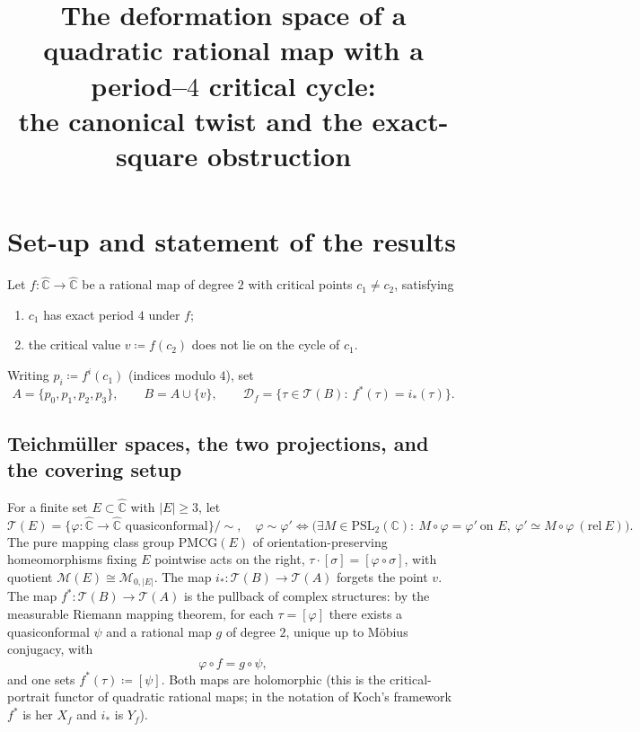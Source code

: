 \documentclass[11pt]{article}
\theoremstyle{definition}
\theoremstyle{remark}
\newcommand{\Teich}{\mathcal T}
\newcommand{\MM}{\mathcal M}
\newcommand{\PMCG}{\mathrm{PMCG}}
\newcommand{\Chat}{\widehat{\mathbb C}}
\newcommand{\Df}{\mathcal D_f}
\begin{document}
\title{The deformation space of a quadratic rational map with a
period--$4$ critical cycle:\\ the canonical twist and the exact-square
obstruction}
\author{}
\date{}
\maketitle

\section{Set-up and statement of the results}\label{sec:setup}

Let $f:\Chat\to\Chat$ be a rational map of degree $2$ with critical
points $c_1\neq c_2$, satisfying
\begin{enumerate}[label=(H\arabic*),leftmargin=3.2em]
\item $c_1$ has exact period $4$ under $f$;
\item the critical value $v\coloneqq f(c_2)$ does not lie on the cycle
of $c_1$.
\end{enumerate}
Writing $p_i\coloneqq f^{i}(c_1)$ (indices modulo $4$), set
\[
A=\{p_0,p_1,p_2,p_3\},\qquad B=A\cup\{v\},\qquad
\Df=\{\tau\in\Teich(B):\ f^*(\tau)=i_*(\tau)\}.
\]

\subsection{Teichm\"uller spaces, the two projections, and the covering
setup}

For a finite set $E\subset\Chat$ with $|E|\ge3$, let
\[
\Teich(E)=\{\varphi:\Chat\to\Chat\text{ quasiconformal}\}/{\sim},
\quad
\varphi\sim\varphi'\iff
\bigl(\exists M\in\mathrm{PSL}_2(\mathbb C):\ M\circ\varphi=\varphi'\
\text{on }E,\ \varphi'\simeq M\circ\varphi\ (\mathrm{rel}\ E)\bigr).
\]
The pure mapping class group $\PMCG(E)$ of orientation-preserving
homeomorphisms fixing $E$ pointwise acts on the right,
$\tau\cdot[\sigma]=[\varphi\circ\sigma]$, with quotient
$\MM(E)\cong\MM_{0,|E|}$.
The map $i_*:\Teich(B)\to\Teich(A)$ forgets the point $v$.
The map $f^*:\Teich(B)\to\Teich(A)$ is the pullback of complex
structures: by the measurable Riemann mapping theorem, for each
$\tau=[\varphi]$ there exists a quasiconformal $\psi$ and a rational
map $g$ of degree $2$, unique up to M\"obius conjugacy, with
\begin{equation}\label{eq:pullback}
\varphi\circ f=g\circ\psi,
\end{equation}
and one sets $f^*(\tau)\coloneqq[\psi]$.  Both maps are holomorphic
(this is the critical-portrait functor of quadratic rational maps;
in the notation of Koch's framework $f^*$ is her $X_f$ and $i_*$ is
$Y_f$).
\end{document}
